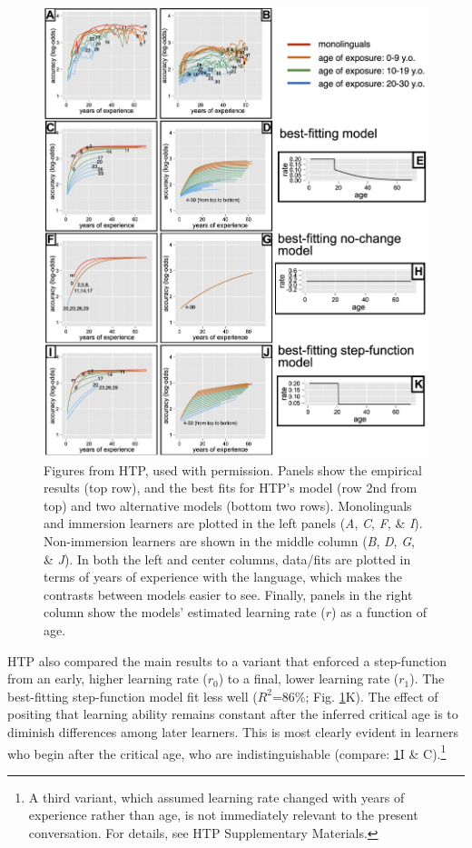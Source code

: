 \documentclass[
  english,
  doc,floatsintext]{apa6}
\begin{document}
\begin{figure}
\includegraphics[width=1\linewidth,height=1\textheight]{Figures/Figure4} \caption{Figures from HTP, used with permission. Panels show the empirical results (top row), and the best fits for HTP's model (row 2nd from top) and two alternative models (bottom two rows). Monolinguals and immersion learners are plotted in the left panels (\emph{A}, \emph{C}, \emph{F}, \& \emph{I}). Non-immersion learners are shown in the middle column (\emph{B}, \emph{D}, \emph{G}, \& \emph{J}). In both the left and center columns, data/fits are plotted in terms of years of experience with the language, which makes the contrasts between models easier to see. Finally, panels in the right column show the models' estimated learning rate (\(r\)) as a function of age.}\label{fig:HTP}
\end{figure}

HTP also compared the main results to a variant that enforced a step-function from an early, higher learning rate (\(r_0\)) to a final, lower learning rate (\(r_1\)). The best-fitting step-function model fit less well (\(R^2\)=86\%; Fig. \ref{fig:HTP}K). The effect of positing that learning ability remains constant after the inferred critical age is to diminish differences among later learners. This is most clearly evident in learners who begin after the critical age, who are indistinguishable (compare: \ref{fig:HTP}I \& C).\footnote{A third variant, which assumed learning rate changed with years of experience rather than age, is not immediately relevant to the present conversation. For details, see HTP Supplementary Materials.}
\end{document}
